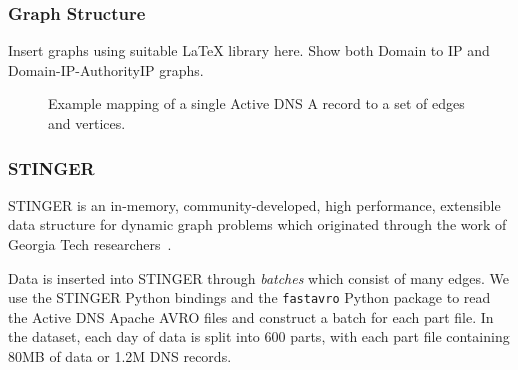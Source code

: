 \documentclass{acm_proc_article-sp}
\begin{document}
\subsubsection{Graph Structure}

Insert graphs using suitable LaTeX library here. Show both Domain to IP and Domain-IP-AuthorityIP graphs.

\begin{figure}
    \usetikzlibrary{arrows.meta}
\caption{
Example mapping of a single Active DNS A record to a set of edges and vertices.}
\label{fig:activednsgraph}
\end{figure}

\subsubsection{STINGER}
STINGER is an in-memory, community-developed, high performance, extensible data structure for dynamic graph problems which originated through the work of Georgia Tech researchers~\cite{STINGER}.

Data is inserted into STINGER through \textit{batches} which consist of many edges. We use the STINGER Python bindings and the \texttt{fastavro} Python package to read the Active DNS Apache AVRO files and construct a batch for each part file. In the dataset, each day of data is split into 600 parts, with each part file containing \ctilde 80MB of data or \ctilde 1.2M DNS records.
\end{document}
